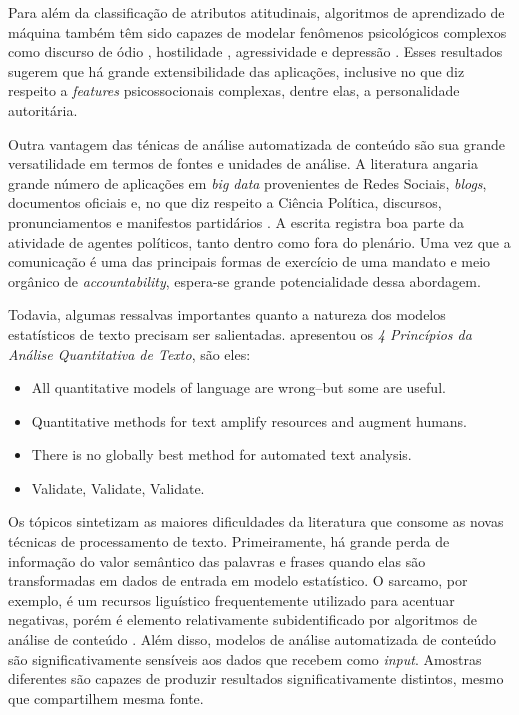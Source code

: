 \documentclass[
12pt,				%
openright,			%
twoside,			%
a4paper,			%
english,			%
french,				%
spanish,			%
brazil				%
]{abntex2}
\begin{document}
Para além da classificação de atributos atitudinais, algoritmos de aprendizado de máquina também têm sido capazes de modelar fenômenos psicológicos complexos como discurso de ódio \cite{davidson2017automated, zampieri2019predicting}, hostilidade \cite{hopp2017does, vargo2017socioeconomic, liu2018forecasting}, agressividade \cite{orasan2018aggressive, sahay2018detecting, nikhil2018lstms} e depressão \cite{mowery2016identifying, chekroud2016cross, orabi2018deep}. Esses resultados sugerem que há grande extensibilidade das aplicações, inclusive no que diz respeito a \emph{features} psicossocionais complexas, dentre elas, a personalidade autoritária.

Outra vantagem das ténicas de análise automatizada de conteúdo são sua grande versatilidade em termos de fontes e unidades de análise. A literatura angaria grande número de aplicações em \emph{big data} provenientes de Redes Sociais, \emph{blogs}, documentos oficiais e, no que diz respeito a Ciência Política, discursos, pronunciamentos e manifestos partidários \cite{grimmer2013text, wilkerson2017large, gentzkow2019text}. A escrita registra boa parte da atividade de agentes políticos, tanto dentro como fora do plenário. Uma vez que a comunicação é uma das principais formas de exercício de uma mandato e meio orgânico de \emph{accountability}, espera-se grande potencialidade dessa abordagem.

Todavia, algumas ressalvas importantes quanto a natureza dos modelos estatísticos de texto precisam ser salientadas.  apresentou os \emph{4 Princípios da Análise Quantitativa de Texto}, são eles:

\begin{itemize}
	\item All quantitative models of language are wrong–but some are useful.
	\item Quantitative methods for text amplify resources and augment humans.
	\item There is no globally best method for automated text analysis.
	\item Validate, Validate, Validate.
\end{itemize}

Os tópicos sintetizam as maiores dificuldades da literatura que consome as novas técnicas de processamento de texto. Primeiramente, há grande perda de informação do valor semântico das palavras e frases quando elas são transformadas em dados de entrada em modelo estatístico. O sarcamo, por exemplo, é um recursos liguístico frequentemente utilizado para acentuar negativas, porém é elemento relativamente subidentificado por algoritmos de análise de conteúdo \cite{maynard2014cares}. Além disso, modelos de análise automatizada de conteúdo são significativamente sensíveis aos dados que recebem como \emph{input}. Amostras diferentes são capazes de produzir resultados significativamente distintos, mesmo que compartilhem mesma fonte.  
\end{document}
